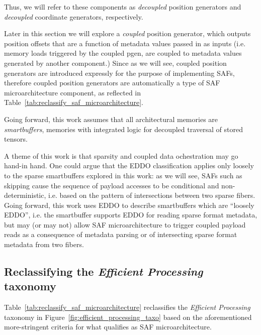 Thus, we will refer to these components as \textit{decoupled} position generators and \textit{decoupled} coordinate generators, respectively.

Later in this section we will explore a \textit{coupled} position generator, which outputs position offsets that are a function of metadata values passed in as inputs (i.e. memory loads triggered by the coupled pgen, are coupled to metadata values generated by another component.) Since as we will see, coupled position generators are introduced expressly for the purpose of implementing SAFs, therefore coupled position generators are automatically a type of SAF microarchitecture component, as reflected in Table~\ref{tab:reclassify_saf_microarchitecture}.

Going forward, this work assumes that all architectural memories are \textit{smartbuffers}\cite{smartbuffer}, memories with integrated logic for decoupled traversal of stored tensors.

A theme of this work is that sparsity and coupled data ochestration may go hand-in hand. One could argue that the EDDO classification applies only loosely to the sparse smartbuffers explored in this work: as we will see, SAFs such as skipping cause the sequence of payload accesses to be conditional and non-deterministic, i.e. based on the pattern of intersections between two sparse fibers. Going forward, this work uses EDDO to describe smartbuffers which are ``loosely EDDO'', i.e. the smartbuffer supports EDDO for reading sparse format metadata, but may (or may not) allow SAF microarchitecture to trigger coupled payload reads as a consequence of metadata parsing or of intersecting sparse format metadata from two fibers.

\subsection{Reclassifying the \textit{Efficient Processing} taxonomy}

Table~\ref{tab:reclassify_saf_microarchitecture} reclassifies the \textit{Efficient Processing} taxonomy in Figure~\ref{fig:efficient_processing_taxo} based on the aforementioned more-stringent criteria for what qualifies as SAF microarchitecture.

